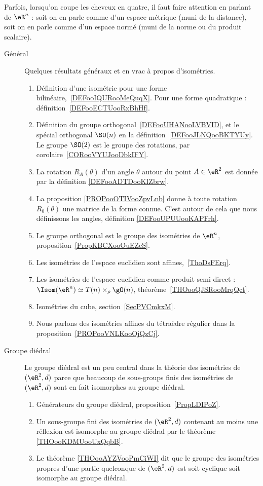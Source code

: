 Parfois, lorsqu'on coupe les cheveux en quatre, il faut faire attention en parlant de \( \eR^n\) : soit on en parle comme d'un espace métrique (muni de la distance), soit on en parle comme d'un espace normé (muni de la norme ou du produit scalaire).

\begin{description}
    \item[Général] 
        Quelques résultats généraux et en vrac à propos d'isométries.
\begin{enumerate}
    \item
        Définition d'une isométrie pour une forme bilinéaire,~\ref{DEFooIQURooMeQuqX}. Pour une forme quadratique : définition~\ref{DEFooECTUooRxBhHf}.
    \item
        Définition du groupe orthogonal~\ref{DEFooUHANooLVBVID}, et le spécial orthogonal \( \SO(n)\) en la définition~\ref{DEFooJLNQooBKTYUy}. Le groupe \( \SO(2)\) est le groupe des rotations, par corolaire~\ref{CORooVYUJooDbkIFY}.
    \item
        La rotation \( R_A(\theta)\) d'un angle \( \theta\) autour du point \( A\in \eR^2\) est donnée par la définition \ref{DEFooADTDooKIZbrw}.
    \item
        La proposition \ref{PROPooOTIVooZpvLnb} donne à toute rotation \( R_0(\theta)\) une matrice de la forme connue. C'est autour de cela que nous définissons les angles, définition \ref{DEFooUPUUooKAPFrh}.
    \item
        Le groupe orthogonal est le groupe des isométries de \( \eR^n\), proposition~\ref{PropKBCXooOuEZcS}.
    \item
        Les isométries de l'espace euclidien sont affines,~\ref{ThoDsFErq}.
    \item
        Les isométries de l'espace euclidien comme produit semi-direct : $\Isom(\eR^n)\simeq T(n)\times_{\rho}\gO(n)$, théorème~\ref{THOooQJSRooMrqQct}.
    \item
        Isométries du cube, section~\ref{SecPVCmkxM}.
    \item
        Nous parlons des isométries affines du tétraèdre régulier dans la proposition~\ref{PROPooVNLKooOjQzCj}.
\end{enumerate}

    \item[Groupe diédral]
        Le groupe diédral est un peu central dans la théorie des isométries de \( (\eR^2,d)\) parce que beaucoup de sous-groups finis des isométries de \( (\eR^2,d)\) sont en fait isomorphes au groupe diédral.
        \begin{enumerate}
    \item
        Générateurs du groupe diédral, proposition~\ref{PropLDIPoZ}.
    \item
        Un sous-groupe fini des isométries de \( (\eR^2,d)\) contenant au moins une réflexion est isomorphe au groupe diédral par le théorème \ref{THOooKDMUooUxQqbB}.
    \item
        Le théorème \ref{THOooAYZVooPmCiWI} dit que le groupe des isométries propres d'une partie quelconque de \( (\eR^2,d)\) est soit cyclique soit isomorphe au groupe diédral.
        \end{enumerate}
        

\end{description}
